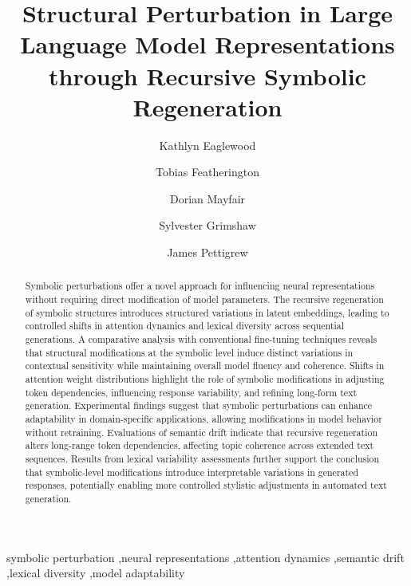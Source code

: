 \documentclass[5p,times]{elsarticle}
\begin{document}
	

\begin{frontmatter}



\title{Structural Perturbation in Large Language Model Representations through Recursive Symbolic Regeneration}

\author{Kathlyn Eaglewood}
\author{Tobias Featherington}
\author{Dorian Mayfair}
\author{Sylvester Grimshaw}
\author{James Pettigrew}










\begin{abstract}
Symbolic perturbations offer a novel approach for influencing neural representations without requiring direct modification of model parameters. The recursive regeneration of symbolic structures introduces structured variations in latent embeddings, leading to controlled shifts in attention dynamics and lexical diversity across sequential generations. A comparative analysis with conventional fine-tuning techniques reveals that structural modifications at the symbolic level induce distinct variations in contextual sensitivity while maintaining overall model fluency and coherence. Shifts in attention weight distributions highlight the role of symbolic modifications in adjusting token dependencies, influencing response variability, and refining long-form text generation. Experimental findings suggest that symbolic perturbations can enhance adaptability in domain-specific applications, allowing modifications in model behavior without retraining. Evaluations of semantic drift indicate that recursive regeneration alters long-range token dependencies, affecting topic coherence across extended text sequences. Results from lexical variability assessments further support the conclusion that symbolic-level modifications introduce interpretable variations in generated responses, potentially enabling more controlled stylistic adjustments in automated text generation. 

	
\end{abstract}



\begin{keyword}

symbolic perturbation \sep neural representations \sep attention dynamics \sep semantic drift \sep lexical diversity \sep model adaptability
\end{keyword}

\end{frontmatter}
\end{document}
